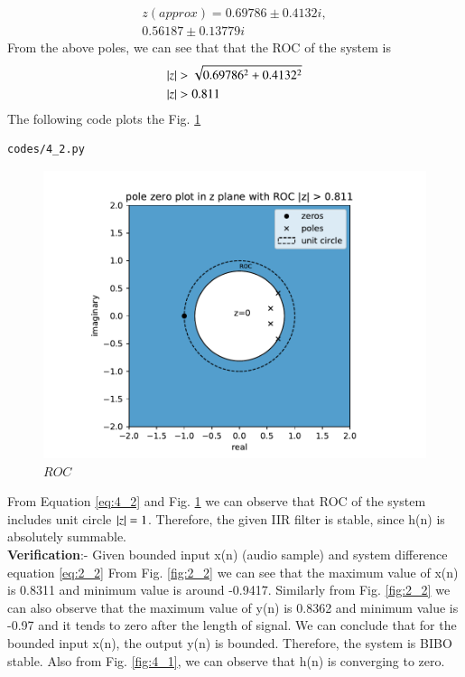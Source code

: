 \documentclass[journal,12pt,twocolumn]{IEEEtran}
\renewcommand\thesection{\arabic{section}}
\begin{document}
\begin{enumerate}[label=\thesection.\arabic*,ref=\thesection.\theenumi]
\begin{equation}
\begin{split}
z(approx) = 0.69786 \pm 0.4132i,
\\
 0.56187 \pm 0.13779i
\end{split}  
\end{equation}
From the above poles, we can see that that the ROC of the system is
\begin{align}
\left\vert z\right\vert&>\sqrt{0.69786^{2}+0.4132^{2}}
\\
\left\vert z\right\vert&>0.811
\label{eq:4_2}
\end{align}
The following code plots the Fig. \ref{fig:4_2}
\begin{lstlisting}
codes/4_2.py
\end{lstlisting}
\begin{figure}[!ht]
\centering
\includegraphics[width=\columnwidth]{./figs/4_2}
\caption{$ROC$}
\label{fig:4_2}
\end{figure}
From Equation \eqref{eq:4_2} and Fig. \ref{fig:4_2} we can observe that ROC of the system includes unit circle $\left\vert z\right\vert=1$. Therefore, the given IIR filter is stable, since h(n) is absolutely summable.
\\
\textbf{Verification}:-
Given bounded input x(n) (audio sample) and system difference equation \eqref{eq:2_2}
From Fig. \ref{fig:2_2} we can see that the maximum value of x(n) is 0.8311 and minimum value is around -0.9417.
Similarly from Fig. \ref{fig:2_2} we can also observe that the maximum value of y(n) is 0.8362 and minimum value is -0.97 and it tends to zero after the length of signal.
We can conclude that for the bounded input x(n), the output
y(n) is bounded. Therefore, the system is BIBO stable. Also from Fig. \ref{fig:4_1}, we can observe that h(n) is converging to zero.

\end{enumerate}
\end{document}
